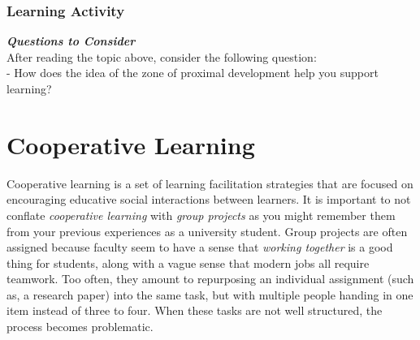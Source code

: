 \documentclass[
]{book}
\begin{document}
\begin{reflect}
\hypertarget{learning-activity-2}{%
\subsubsection{Learning Activity}\label{learning-activity-2}}

\textbf{\emph{Questions to Consider}}\\
After reading the topic above, consider the following question:\\
- How does the idea of the zone of proximal development help you support learning?
\end{reflect}

\hypertarget{cooperative-learning}{%
\section{Cooperative Learning}\label{cooperative-learning}}

Cooperative learning is a set of learning facilitation strategies that are focused on encouraging educative social interactions between learners. It is important to not conflate \emph{cooperative learning} with \emph{group projects} as you might remember them from your previous experiences as a university student. Group projects are often assigned because faculty seem to have a sense that \emph{working together} is a good thing for students, along with a vague sense that modern jobs all require teamwork. Too often, they amount to repurposing an individual assignment (such as, a research paper) into the same task, but with multiple people handing in one item instead of three to four. When these tasks are not well structured, the process becomes problematic.
\end{document}
